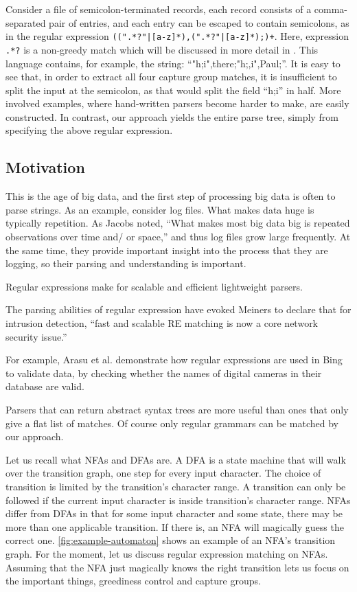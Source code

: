 \documentclass[english]{sigplanconf}
\theoremstyle{definition}
\newcommand{\ins}[1]{\textcolor{blue}{\uline{#1}}} %
\newcommand{\ins}[1]{#1} %
\renewcommand{\ins}[1]{#1} %
\begin{document}
Consider a file of semicolon-terminated records, each record consists
of a comma-separated pair of entries, and each entry can be escaped
to contain semicolons, as in the regular expression
\texttt{((".*?"|[a-z]*),(".*?"|[a-z]*);)+}. Here, expression
\texttt{.*?} is a non-greedy match which will be discussed in more
detail in .  This language contains, for example, the
string: ``"h;i",there;"h;,i",Paul;''.  It is easy to see that, in
order to extract all four capture group matches, it is insufficient
to split the input at the semicolon, as that would split the field
``h;i'' in half.  More involved examples, where hand-written parsers
become harder to make, are easily constructed.  In contrast, our
approach yields the entire parse tree, simply from specifying the
above regular expression.


\subsection{Motivation}

This is the age of big data, and the first step of processing big
data is often to parse strings. As an example, consider log files.
What makes data huge is typically repetition. As Jacobs\cite{Jaco09a}
noted, ``What makes most big data big is repeated observations over
time and/ or space,'' and thus log files grow large frequently. At
the same time, they provide important insight into the process that
they are logging, so their parsing and understanding is important. 

Regular expressions make for scalable and efficient lightweight parsers.\cite{Kart96a} 

The parsing abilities of regular expression have evoked Meiners to declare
that for intrusion detection, ``fast and scalable RE matching is
now a core network security issue.'' \cite{Mein10a}

For example, Arasu et al. \cite{Aras12a} demonstrate how regular
expressions are used in Bing to validate data, by checking whether
the names of digital cameras in their database are valid.

Parsers that can return abstract syntax trees are more useful than
ones that only give a flat list of matches. Of course only regular
grammars can be matched by our approach.

Let us recall what NFAs and DFAs are. A DFA is a state machine that
will walk over the transition graph, one step for every input
character. The choice of transition is limited by the transition's
character range. A transition can only be followed if the current
input character is inside transition's character range. NFAs differ
from DFAs in that for some input character and some state, there may
be more than \ins{one} applicable transition. If there is, an NFA will magically
guess the correct one. \autoref{fig:example-automaton} shows an example of
an NFA's transition graph. For the moment, let us discuss regular
expression matching on NFAs. Assuming that the NFA just magically knows
the right transition lets us focus on the important things, greediness control
and capture groups.
\end{document}
